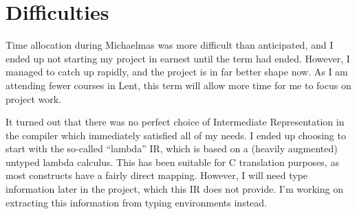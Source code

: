 \documentclass[12pt,twoside,a4paper]{article}
\begin{document}
\section*{Difficulties}

Time allocation during Michaelmas was more difficult than anticipated, and I ended up not starting my project in earnest until the term had ended. However, I managed to catch up rapidly, and the project is in far better shape now. As I am attending fewer courses in Lent, this term will allow more time for me to focus on project work.

It turned out that there was no perfect choice of Intermediate Representation in the compiler which immediately satisfied all of my needs. I ended up choosing to start with the so-called ``lambda'' IR, which is based on a (heavily augmented) untyped lambda calculus. This has been suitable for C translation purposes, as most constructs have a fairly direct mapping. However, I will need type information later in the project, which this IR does not provide. I'm working on extracting this information from typing environments instead.
\end{document}
